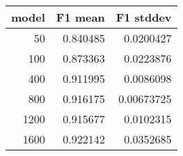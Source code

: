\begin{tabular}{rrr}
\toprule
   model &   F1 mean &   F1 stddev \\
\midrule
      50 &  0.840485 &  0.0200427  \\
     100 &  0.873363 &  0.0223876  \\
     400 &  0.911995 &  0.0086098  \\
     800 &  0.916175 &  0.00673725 \\
    1200 &  0.915677 &  0.0102315  \\
    1600 &  0.922142 &  0.0352685  \\
\bottomrule
\end{tabular}